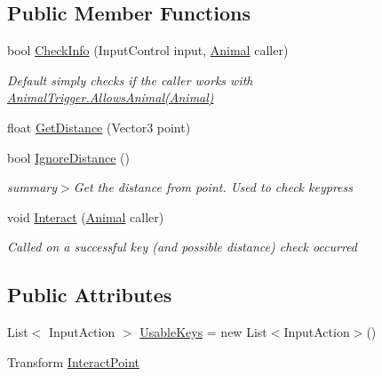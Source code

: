 \subsection*{Public Member Functions}
\begin{DoxyCompactItemize}
\item 
bool \mbox{\hyperlink{class_attachable_interact_a8426a9821130ecde5ed75517ca2ee5d7}{Check\+Info}} (Input\+Control input, \mbox{\hyperlink{class_animal}{Animal}} caller)
\begin{DoxyCompactList}\small\item\em Default simply checks if the {\itshape caller}  works with \mbox{\hyperlink{class_animal_trigger_ae8394dfcf5f91b8c413959a4d6baa3a9}{Animal\+Trigger.\+Allows\+Animal(\+Animal)}} \end{DoxyCompactList}\item 
float \mbox{\hyperlink{class_attachable_interact_abeaa046ec8352957e008cde245fd4f65}{Get\+Distance}} (Vector3 point)
\item 
bool \mbox{\hyperlink{class_attachable_interact_a2778c59435948c3a3794664ceadc0c7f}{Ignore\+Distance}} ()
\begin{DoxyCompactList}\small\item\em summary$>$Get the distance from point. Used to check keypress\end{DoxyCompactList}\item 
void \mbox{\hyperlink{class_attachable_interact_a3ce9d2122b8b014f608ed3ed1004f909}{Interact}} (\mbox{\hyperlink{class_animal}{Animal}} caller)
\begin{DoxyCompactList}\small\item\em Called on a successful key (and possible distance) check occurred\end{DoxyCompactList}\end{DoxyCompactItemize}
\subsection*{Public Attributes}
\begin{DoxyCompactItemize}
\item 
List$<$ Input\+Action $>$ \mbox{\hyperlink{class_attachable_interact_a3c3ffc1d5b3cfd3bc9b4fde20a772901}{Usable\+Keys}} = new List$<$Input\+Action$>$()
\item 
Transform \mbox{\hyperlink{class_attachable_interact_ad46e0ca3808d58ab5e1102e379d6cb7e}{Interact\+Point}}
\end{DoxyCompactItemize}
